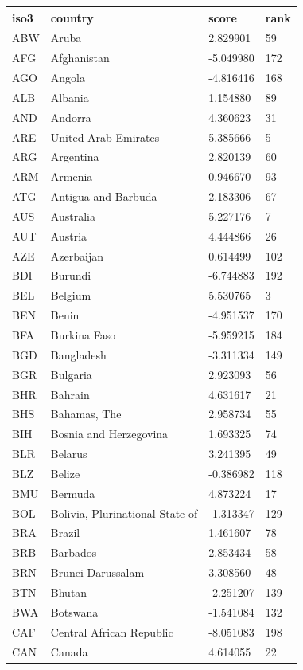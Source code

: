 \begin{tabular}{llll}
\hline
iso3 & country & score & rank \\
\hline
ABW & Aruba & 2.829901 & 59 \\
AFG & Afghanistan & -5.049980 & 172 \\
AGO & Angola & -4.816416 & 168 \\
ALB & Albania & 1.154880 & 89 \\
AND & Andorra & 4.360623 & 31 \\
ARE & United Arab Emirates & 5.385666 & 5 \\
ARG & Argentina & 2.820139 & 60 \\
ARM & Armenia & 0.946670 & 93 \\
ATG & Antigua and Barbuda & 2.183306 & 67 \\
AUS & Australia & 5.227176 & 7 \\
AUT & Austria & 4.444866 & 26 \\
AZE & Azerbaijan & 0.614499 & 102 \\
BDI & Burundi & -6.744883 & 192 \\
BEL & Belgium & 5.530765 & 3 \\
BEN & Benin & -4.951537 & 170 \\
BFA & Burkina Faso & -5.959215 & 184 \\
BGD & Bangladesh & -3.311334 & 149 \\
BGR & Bulgaria & 2.923093 & 56 \\
BHR & Bahrain & 4.631617 & 21 \\
BHS & Bahamas, The & 2.958734 & 55 \\
BIH & Bosnia and Herzegovina & 1.693325 & 74 \\
BLR & Belarus & 3.241395 & 49 \\
BLZ & Belize & -0.386982 & 118 \\
BMU & Bermuda & 4.873224 & 17 \\
BOL & Bolivia, Plurinational State of & -1.313347 & 129 \\
BRA & Brazil & 1.461607 & 78 \\
BRB & Barbados & 2.853434 & 58 \\
BRN & Brunei Darussalam & 3.308560 & 48 \\
BTN & Bhutan & -2.251207 & 139 \\
BWA & Botswana & -1.541084 & 132 \\
CAF & Central African Republic & -8.051083 & 198 \\
CAN & Canada & 4.614055 & 22 \\

\end{tabular}
